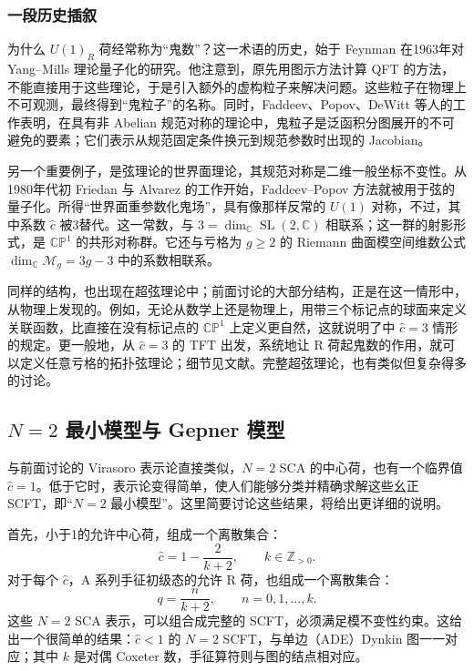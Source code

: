 \subsubsection{一段历史插叙}\label{sec:3.3.5.4}

为什么 $U(1)_R$ 荷经常称为“鬼数”？这一术语的历史，始于 Feynman 在1963年对 Yang--Mills 理论量子化的研究。他注意到，原先用图示方法计算 QFT 的方法，不能直接用于这些理论，于是引入额外的虚构粒子来解决问题。这些粒子在物理上不可观测，最终得到“鬼粒子”的名称。同时，Faddeev、Popov、DeWitt 等人的工作表明，在具有非 Abelian 规范对称的理论中，鬼粒子是泛函积分图展开的不可避免的要素；它们表示从规范固定条件换元到规范参数时出现的 Jacobian。

另一个重要例子，是弦理论的世界面理论，其规范对称是二维一般坐标不变性。从1980年代初 Friedan 与 Alvarez 的工作开始，Faddeev--Popov 方法就被用于弦的量子化。所得“世界面重参数化鬼场”，具有像那样反常的 $U(1)$ 对称，不过，其中系数 $\widehat c$ 被3替代。这一常数，与 $3=\dim_{\mathbb{C}}\operatorname{SL}(2,\mathbb{C})$ 相联系；这一群的射影形式，是 $\mathbb{CP}^1$ 的共形对称群。它还与亏格为 $g\ge2$ 的 Riemann 曲面模空间维数公式 $\dim_{\mathbb{C}}\mathcal{M}_g=3g-3$ 中的系数相联系。

同样的结构，也出现在超弦理论中；前面讨论的大部分结构，正是在这一情形中，从物理上发现的。例如，无论从数学上还是物理上，用带三个标记点的球面来定义关联函数，比直接在没有标记点的 $\mathbb{CP}^1$ 上定义更自然，这就说明了中 $\widehat c=3$ 情形的规定。更一般地，从 $\widehat c=3$ 的 TFT 出发，系统地让 R 荷起鬼数的作用，就可以定义任意亏格的拓扑弦理论；细节见文献。完整超弦理论，也有类似但复杂得多的讨论。

\subsection{\texorpdfstring{$N=2$}{N=2} 最小模型与 Gepner 模型}\label{sec:3.3.6}

与前面讨论的 Virasoro 表示论直接类似，$N=2$ SCA 的中心荷，也有一个临界值 $\widehat c=1$。低于它时，表示论变得简单，使人们能够分类并精确求解这些幺正 SCFT，即“$N=2$ 最小模型”。这里简要讨论这些结果，将给出更详细的说明。

首先，小于1的允许中心荷，组成一个离散集合：
\[
\widehat c=1-\frac2{k+2},\qquad k\in\mathbb{Z}_{>0}.
\]
对于每个 $\widehat c$，A 系列手征初级态的允许 R 荷，也组成一个离散集合：
\[
q=\frac n{k+2},\qquad n=0,1,\ldots,k.
\]
这些 $N=2$ SCA 表示，可以组合成完整的 SCFT，必须满足模不变性约束。这给出一个很简单的结果：$\widehat c<1$ 的 $N=2$ SCFT，与单边（ADE）Dynkin 图一一对应；其中 $k$ 是对偶 Coxeter 数，手征算符则与图的结点相对应。

